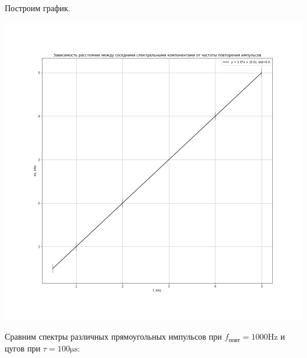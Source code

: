\documentclass[12pt,a4paper]{article}
\begin{document}
        Построим график.
    
        \begin{center}
            \includegraphics[width=\linewidth]{img/4.png}
        \end{center}
       
        \newpage
        Сравним спектры различных прямоугольных импульсов при $f_{\text{повт}} = 1000\si{\hertz}$ и цугов при $\tau = 100 \si{\micro\second}$:
        
\end{document}
